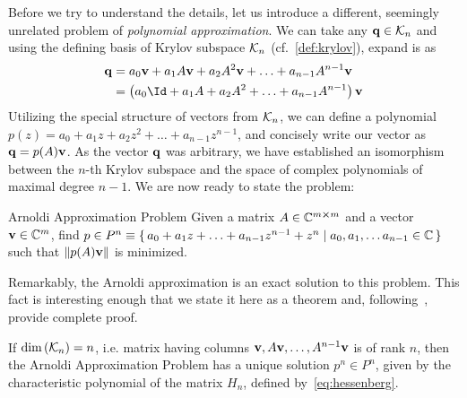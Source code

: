 Before we try to understand the details, let us introduce a different, seemingly unrelated problem of
\textit{polynomial approximation}. We can take any \(\vectorbold{q} \in \K{n}\) and using the
defining basis of Krylov subspace \(\mathcal{K}_{n}\) (cf.~\ref{def:krylov}), expand is as
\begin{align}
	\vectorbold{q} & = a_0 \vectorbold{v} + a_1 A \vectorbold{v} + a_2 A^2 \vectorbold{v} + \ldots + a_{n-1} A^{n-1} \vectorbold{v} \nonumber \\
	               & = \left(a_0\Id + a_1 A + a_2 A^2 + \ldots + a_{n-1} A^{n-1}\right) \vectorbold{v}
\end{align}
Utilizing the special structure of vectors from \(\mathcal{K}_{n}\), we can define a polynomial \(p(z) = a_0
+ a_1 z + a_2 z^2 + \ldots + a_{n-1}z^{n-1}\), and concisely write our vector as \(\vectorbold{q} = p(A)\vectorbold{v}\).
As the vector \(\vectorbold{q}\) was arbitrary, we have established an isomorphism between the \(n\)-th Krylov
subspace and the space of complex polynomials of maximal degree \(n-1\). We are now ready to state the problem:
\vspace{-0.3cm}
\begin{titled-frame}{Arnoldi Approximation Problem}
\centering
Given a matrix \(A\in\mathbb{C}^{m\cross m}\) and a vector \(\vectorbold{v}\in \CC^m\), find
\( p \in P^n \equiv \{\, a_0 + a_1 z + \ldots + a_{n-1} z^{n-1} + z^n \mid a_0,a_1,\ldots a_{n-1}\in \mathbb{C} \,\} \)\\
such that \(\norm{p(A)\vectorbold{v}}\) is minimized.
\end{titled-frame}
\noindent Remarkably, the Arnoldi approximation is an exact solution to this problem. This fact is interesting enough that
we state it here as a theorem and, following~\textcite{Trefethen1997}, provide complete proof.

\begin{theorem}
	If \(\textrm{dim}\left(\mathcal{K}_{n}\right) = n\), i.e. matrix having columns \(\vectorbold{v},A\vectorbold{v},\ldots, A^{n-1}
	\vectorbold{v}\) is of rank \(n\), then the Arnoldi Approximation Problem has a unique solution \(p^n\in P^n\),
	given by the characteristic polynomial of the matrix \(H_n\), defined by~\eqref{eq:hessenberg}.
	\label{theorem:arnoldi_approximation}
\end{theorem}

